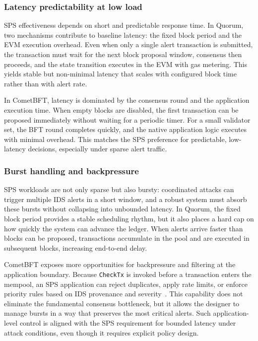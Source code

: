 \subsubsection{Latency predictability at low load}
SPS effectiveness depends on short and predictable response time. In Quorum, two mechanisms contribute to baseline latency: the fixed block period and the EVM execution overhead. Even when only a single alert transaction is submitted, the transaction must wait for the next block proposal window, consensus then proceeds, and the state transition executes in the EVM with gas metering. This yields stable but non-minimal latency that scales with configured block time rather than with alert rate.

In CometBFT, latency is dominated by the consensus round and the application execution time. When empty blocks are disabled, the first transaction can be proposed immediately without waiting for a periodic timer. For a small validator set, the BFT round completes quickly, and the native application logic executes with minimal overhead. This matches the SPS preference for predictable, low-latency decisions, especially under sparse alert traffic.

\subsubsection{Burst handling and backpressure}
SPS workloads are not only sparse but also bursty: coordinated attacks can trigger multiple IDS alerts in a short window, and a robust system must absorb these bursts without collapsing into unbounded latency. In Quorum, the fixed block period provides a stable scheduling rhythm, but it also places a hard cap on how quickly the system can advance the ledger. When alerts arrive faster than blocks can be proposed, transactions accumulate in the pool and are executed in subsequent blocks, increasing end-to-end delay.

CometBFT exposes more opportunities for backpressure and filtering at the application boundary. Because \texttt{CheckTx} is invoked before a transaction enters the mempool, an SPS application can reject duplicates, apply rate limits, or enforce priority rules based on IDS provenance and severity~\cite{abciOverview}. This capability does not eliminate the fundamental consensus bottleneck, but it allows the designer to manage bursts in a way that preserves the most critical alerts. Such application-level control is aligned with the SPS requirement for bounded latency under attack conditions, even though it requires explicit policy design.

